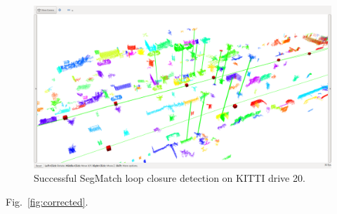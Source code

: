 \begin{figure}
  \centering
  \includegraphics[width=5.2in]{images/segmatchae.png}
  \caption{Successful SegMatch loop closure detection on KITTI drive 20.}
  \label{fig:segmatch-loop-closure}
\end{figure}

Fig.~\ref{fig:corrected}.\\

